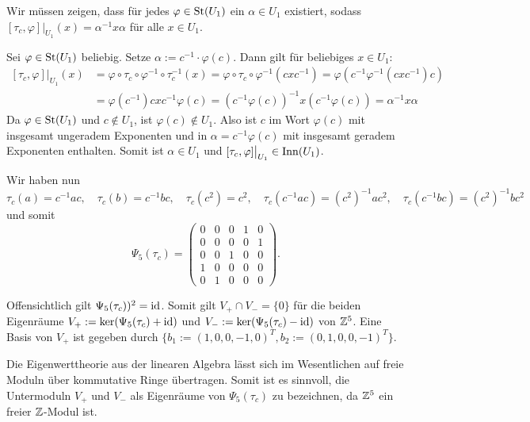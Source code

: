 \begin{beweis}
	Wir müssen zeigen, dass für jedes $\varphi \in \operatorname{St}(U_1)$ ein $\alpha \in U_1$ existiert, sodass $[\tau_c,\varphi] \big|_{U_1} (x) = \alpha^{-1} x \alpha$ für alle $x \in U_1$.
	
	Sei $\varphi \in \operatorname{St}(U_1)$ beliebig. Setze $\alpha := c^{-1} \cdot \varphi(c)$. Dann gilt für beliebiges $x \in U_1$:
	\begin{equation}
	\begin{aligned}
		[\tau_c,\varphi]\big|_{U_1} (x) &= \varphi \circ \tau_c \circ \varphi^{-1} \circ \tau_c^{-1}(x)
		= \varphi \circ \tau_c \circ \varphi^{-1} (cxc^{-1})
		= \varphi(c^{-1} \varphi^{-1}(cxc^{-1}) c) \\
		&= \varphi(c^{-1}) cxc^{-1} \varphi(c)
		= (c^{-1} \varphi(c))^{-1} x (c^{-1} \varphi(c))
		= \alpha^{-1} x \alpha
	\end{aligned}
	\end{equation}
	Da $\varphi \in \operatorname{St}(U_1)$ und $c \notin U_1$, ist $\varphi(c) \notin U_1$. Also ist $c$ im Wort $\varphi(c)$ mit insgesamt ungeradem Exponenten und in $\alpha = c^{-1} \varphi(c)$ mit insgesamt geradem Exponenten enthalten. Somit ist $\alpha \in U_1$ und $[\tau_c,\varphi]\big|_{U_1} \in \operatorname{Inn}(U_1)$. \qedhere
\end{beweis}

Wir haben nun
\[
	\tau_c(a) = c^{-1}ac, \quad \tau_c(b) = c^{-1}bc, \quad \tau_c(c^2) = c^2, \quad \tau_c(c^{-1}ac) = (c^2)^{-1}ac^2, \quad \tau_c(c^{-1}bc) = (c^2)^{-1} bc^2
\]
und somit
\[
	\Psi_5(\tau_c) = \begin{pmatrix}
	0 & 0 & 0 & 1 & 0 \\ 
	0 & 0 & 0 & 0 & 1 \\ 
	0 & 0 & 1 & 0 & 0 \\ 
	1 & 0 & 0 & 0 & 0 \\ 
	0 & 1 & 0 & 0 & 0
	\end{pmatrix}. 
\]

Offensichtlich gilt $\Psi_5(\tau_c))^2 = \operatorname{id}$. Somit gilt $V_+ \cap V_- = \{0\}$ für die beiden Eigenräume $V_+ := \ker(\Psi_5(\tau_c) + \operatorname{id})$ und $V_- := \ker(\Psi_5(\tau_c) - \operatorname{id})$ von $\mathbb{Z}^5$. Eine Basis von $V_+$ ist gegeben durch \linebreak $\{b_1 := (1,0,0,-1,0)^T, b_2 := (0,1,0,0,-1)^T\}$.

\begin{bemerkung}
	Die Eigenwerttheorie aus der linearen Algebra lässt sich im Wesentlichen auf freie Moduln über kommutative Ringe übertragen. Somit ist es sinnvoll, die Untermoduln $V_+$ und $V_-$ als Eigenräume von $\Psi_5(\tau_c)$ zu bezeichnen, da $\mathbb{Z}^5$ ein freier $\mathbb{Z}$-Modul ist.
\end{bemerkung}

